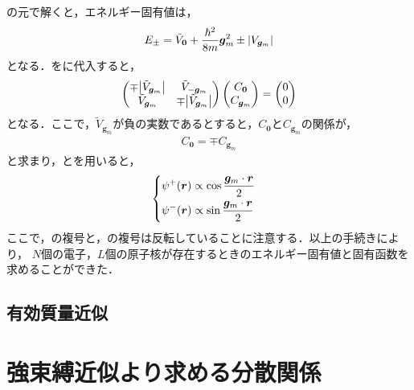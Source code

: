 \documentclass{report}
\begin{document}
      の元で解くと，エネルギー固有値は，
      \begin{align}
        E_{\pm} = \tilde{V}_{\bm{0}} + \frac{\hbar^2}{8m}\bm{g}_m^2 \pm \abs{V_{\bm{g}_m}} \label{energy}
      \end{align}
      となる．をに代入すると，
      \begin{align}
        \begin{pmatrix}
          \mp \abs{\tilde{V}_{\bm{g}_m}} & \tilde{V}_{-\bm{g}_m} \\
          \tilde{V}_{\bm{g}_m} & \mp \abs{\tilde{V}_{\bm{g}_m}}
        \end{pmatrix}
        \begin{pmatrix}
          C_{\bm{0}} \\ 
          C_{\bm{g}_m}
        \end{pmatrix}
        = \begin{pmatrix}
          0 \\ 
          0
        \end{pmatrix}
      \end{align}
      となる．ここで，$\tilde{V}_{\bm{g}_m}$が負の実数であるとすると，$C_{\bm{0}}$と$C_{\bm{g}_m}$の関係が，
      \begin{align}
        C_{\bm{0}} = \mp C_{\bm{g}_m}
      \end{align}
      と求まり，とを用いると，
      \begin{align}
        &\begin{dcases}
          \psi^{+}(\bm{r}) \propto \cos \frac{\bm{g}_m\cdot\bm{r}}{2} \\ 
          \psi^{-}(\bm{r}) \propto \sin \frac{\bm{g}_m\cdot\bm{r}}{2}
        \end{dcases}\label{wave-function}
      \end{align}
      ここで，の複号と，の複号は反転していることに注意する．以上の手続きにより，
      $N$個の電子，$L$個の原子核が存在するときのエネルギー固有値と固有函数を求めることができた．
    \section{有効質量近似}
  \chapter{強束縛近似より求める分散関係}
\end{document}
